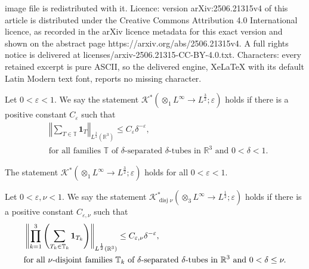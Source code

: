 \documentclass[10pt,a4paper]{amsart}
\begin{document}
image file is redistributed with it. Licence: version arXiv:2506.21315v4 of this article is distributed under the Creative Commons Attribution 4.0 International licence, as recorded in the arXiv licence metadata for this exact version and shown on the abstract page https://arxiv.org/abs/2506.21315v4. A full rights notice is delivered at licenses/arxiv-2506.21315-CC-BY-4.0.txt. Characters: every retained excerpt is pure ASCII, so the delivered engine, XeLaTeX with its default Latin Modern text font, reports no missing character.
\begin{definition}
Let $0<\varepsilon<1$. We say the statement $\mathcal{K}^{\ast}\left(
\otimes_{1}L^{\infty}\rightarrow L^{\frac{3}{2}};\varepsilon\right)  $ holds
if there is a positive constant $C_{\varepsilon}$ such that%
\begin{align}
&  \left\Vert \sum_{T\in\mathbb{T}}\mathbf{1}_{T}\right\Vert _{L^{\frac{3}{2}%
}\left(  \mathbb{R}^{3}\right)  }\leq C_{\varepsilon}\delta^{-\varepsilon
},\label{Kak dual}\\
&  \text{for all families }\mathbb{T}\text{ of }\delta\text{-separated }%
\delta\text{-tubes in }\mathbb{R}^{3}\text{ and }0<\delta<1.\nonumber
\end{align}

\end{definition}

\begin{conjecture}
\label{linear Kakeya}The statement $\mathcal{K}^{\ast}\left(  \otimes
_{1}L^{\infty}\rightarrow L^{\frac{3}{2}};\varepsilon\right)  $ holds for all
$0<\varepsilon<1$.
\end{conjecture}

\begin{definition}
Let $0<\varepsilon,\nu<1$. We say the statement $\mathcal{K}%
_{\operatorname*{disj}\nu}^{\ast}\left(  \otimes_{3}L^{\infty}\rightarrow
L^{\frac{1}{2}};\varepsilon\right)  $ holds if there is a positive constant
$C_{\varepsilon,\nu}$ such that%
\begin{align}
&  \left\Vert \prod_{k=1}^{3}\left(  \sum_{T_{k}\in\mathbb{T}_{k}}%
\mathbf{1}_{T_{k}}\right)  \right\Vert _{L^{\frac{1}{2}}\left(  \mathbb{R}%
^{3}\right)  }\leq C_{\varepsilon,\nu}\delta^{-\varepsilon}%
,\label{tri Kak dual}\\
&  \text{for all }\nu\text{\emph{-disjoint }families }\mathbb{T}_{k}\text{ of
}\delta\text{-separated }\delta\text{-tubes in }\mathbb{R}^{3}\text{ and
}0<\delta\leq\nu.\nonumber
\end{align}

\end{definition}
\end{document}
